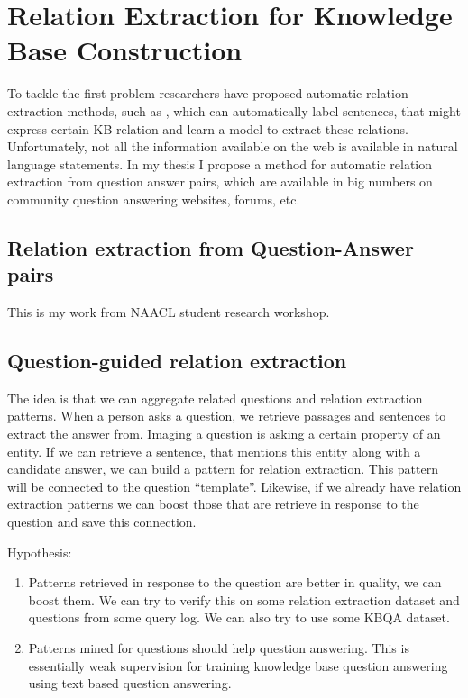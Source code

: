 \section{Relation Extraction for Knowledge Base Construction}
\label{sec:relation_extraction}

To tackle the first problem researchers have proposed automatic relation extraction methods, such as \cite{MintzBSJ09}, which can automatically label sentences, that might express certain KB relation and learn a model to extract these relations.
Unfortunately, not all the information available on the web is available in natural language statements.
In my thesis I propose a method for automatic relation extraction from question answer pairs, which are available in big numbers on community question answering websites, forums, etc.

\subsection{Relation extraction from Question-Answer pairs}
\label{subsec:cqa_relextract}

This is my work from NAACL student research workshop.

\subsection{Question-guided relation extraction}
\label{subsec:question_based_relextract}
The idea is that we can aggregate related questions and relation extraction patterns.
When a person asks a question, we retrieve passages and sentences to extract the answer from.
Imaging a question is asking a certain property of an entity.
If we can retrieve a sentence, that mentions this entity along with a candidate answer, we can build a pattern for relation extraction.
This pattern will be connected to the question ``template''.
Likewise, if we already have relation extraction patterns we can boost those that are retrieve in response to the question and save this connection.

Hypothesis:
\begin{enumerate}
\item Patterns retrieved in response to the question are better in quality, we can boost them. We can try to verify this on some relation extraction dataset and questions from some query log. We can also try to use some KBQA dataset.
\item Patterns mined for questions should help question answering. This is essentially weak supervision for training knowledge base question answering using text based question answering.
\end{enumerate}

